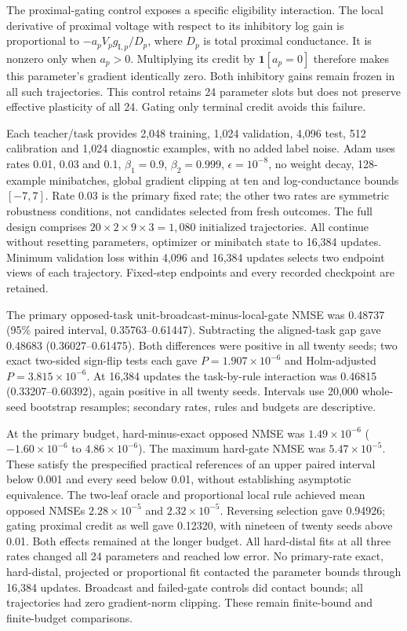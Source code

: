 The proximal-gating control exposes a specific eligibility interaction. The local derivative of proximal voltage with respect to its inhibitory log gain is proportional to $-a_pV_pg_{\mathrm I,p}/D_p$, where $D_p$ is total proximal conductance. It is nonzero only when $a_p>0$. Multiplying its credit by $\mathbf1[a_p=0]$ therefore makes this parameter's gradient identically zero. Both inhibitory gains remain frozen in all such trajectories. This control retains 24 parameter slots but does not preserve effective plasticity of all 24. Gating only terminal credit avoids this failure.

Each teacher/task provides 2,048 training, 1,024 validation, 4,096 test, 512 calibration and 1,024 diagnostic examples, with no added label noise. Adam uses rates 0.01, 0.03 and 0.1, $\beta_1=0.9$, $\beta_2=0.999$, $\epsilon=10^{-8}$, no weight decay, 128-example minibatches, global gradient clipping at ten and log-conductance bounds $[-7,7]$. Rate 0.03 is the primary fixed rate; the other two rates are symmetric robustness conditions, not candidates selected from fresh outcomes. The full design comprises $20\times2\times9\times3=1,080$ initialized trajectories. All continue without resetting parameters, optimizer or minibatch state to 16,384 updates. Minimum validation loss within 4,096 and 16,384 updates selects two endpoint views of each trajectory. Fixed-step endpoints and every recorded checkpoint are retained.

The primary opposed-task unit-broadcast-minus-local-gate NMSE was 0.48737 (95\% paired interval, 0.35763--0.61447). Subtracting the aligned-task gap gave 0.48683 (0.36027--0.61475). Both differences were positive in all twenty seeds; two exact two-sided sign-flip tests each gave $P=1.907\times10^{-6}$ and Holm-adjusted $P=3.815\times10^{-6}$. At 16,384 updates the task-by-rule interaction was 0.46815 (0.33207--0.60392), again positive in all twenty seeds. Intervals use 20,000 whole-seed bootstrap resamples; secondary rates, rules and budgets are descriptive.

At the primary budget, hard-minus-exact opposed NMSE was $1.49\times10^{-6}$ ($-1.60\times10^{-6}$ to $4.86\times10^{-6}$). The maximum hard-gate NMSE was $5.47\times10^{-5}$. These satisfy the prespecified practical references of an upper paired interval below 0.001 and every seed below 0.01, without establishing asymptotic equivalence. The two-leaf oracle and proportional local rule achieved mean opposed NMSEs $2.28\times10^{-5}$ and $2.32\times10^{-5}$. Reversing selection gave 0.94926; gating proximal credit as well gave 0.12320, with nineteen of twenty seeds above 0.01. Both effects remained at the longer budget. All hard-distal fits at all three rates changed all 24 parameters and reached low error. No primary-rate exact, hard-distal, projected or proportional fit contacted the parameter bounds through 16,384 updates. Broadcast and failed-gate controls did contact bounds; all trajectories had zero gradient-norm clipping. These remain finite-bound and finite-budget comparisons.

